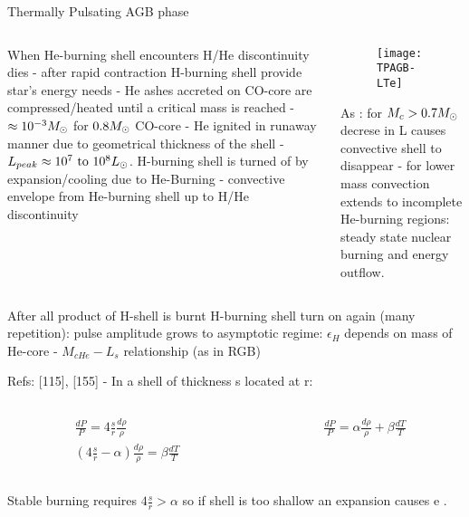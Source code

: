 \begin{frame}{Thermally Pulsating AGB phase}
\begin{columns}[T]
	\begin{column}{0.48\textwidth}
 	When He-burning shell encounters H/He discontinuity dies - after rapid contraction H-burning shell provide star's energy needs - He ashes accreted on CO-core are compressed/heated until a critical mass is reached - $\approx\num{e-3}M_{\odot}$ for $0.8M_{\odot}$ CO-core - He ignited in runaway manner due to geometrical thickness of the shell - $L_{peak}\approx\numrange{e7}{e8}\lsun$.
	H-burning shell is turned of by expansion/cooling due to He-Burning - convective envelope from He-burning shell up to H/He discontinuity
	\end{column}
	\begin{column}{0.52\textwidth}
		\begin{figure}[!ht]
			\texttt{[image: TPAGB-LTe]}\label{fig:TPAGB-LTe}
		\end{figure}
	As  : for $M_c>0.7M_{\odot}$ decrese in L causes convective shell to disappear - for lower mass convection extends to incomplete He-burning regions: steady state nuclear burning and energy outflow.
\end{column}\end{columns}
After all product of H-shell is burnt H-burning shell turn on again (many repetition): pulse amplitude grows to asymptotic regime: $\epsilon_H$ depends on mass of He-core - $M_{cHe}-L_s$ relationship (as in RGB)
\end{frame}

\begin{frame}{}
Refs: [115], [155] - In a shell of thickness s located at r:
\begin{columns}[T]\begin{column}{0.5\textwidth}
\begin{align*}
&\frac{dP}{P}=4\frac{s}{r}\frac{d\rho}{\rho}\\
&(4\frac{s}{r}-\alpha)\frac{d\rho}{\rho}=\beta\frac{dT}{T}
\end{align*}
\end{column}
\begin{column}{0.5\textwidth}
\begin{align*}
&\frac{dP}{P}=\alpha\frac{d\rho}{\rho}+\beta\frac{dT}{T}
\end{align*} 
\end{column}\end{columns}
Stable burning requires $4\frac{s}{r}>\alpha$ so if shell is too shallow an expansion causes \xdiminuisce{\rho} e .
\end{frame}

